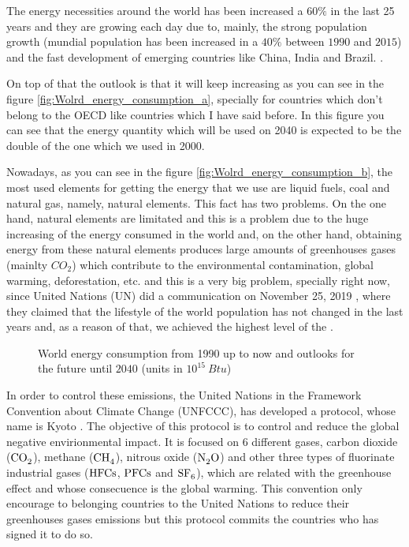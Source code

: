 The energy necessities around the world has been increased a $60\%$ in the last 25 years and they are growing each day due to, mainly, the strong population growth (mundial population has been increased in a $40\%$ between $1990$ and $2015$) and the fast development of emerging countries like China, India and Brazil. \cite{Renovables}. 

On top of that the outlook is that it will keep increasing as you can see in the figure \ref{fig:Wolrd_energy_consumption_a}, specially for countries which don't belong to the OECD like countries which I have said before. In this figure you can see that the energy quantity which will be used on 2040 is expected to be the double of the one which we used in 2000. 

Nowadays, as you can see in the figure \ref{fig:Wolrd_energy_consumption_b}, the most used elements for getting the energy that we use are liquid fuels, coal and natural gas, namely, natural elements. This fact has two problems. On the one hand, natural elements are limitated and this is a problem due to the huge increasing of the energy consumed in the world and, on the other hand, obtaining energy from these natural elements produces large amounts of greenhouses gases (mainlty $CO_2$) which contribute to the environmental contamination, global warming, deforestation, etc. and this is a very big problem, specially right now, since United Nations (UN) did a communication on November 25, 2019 \cite{HighestCO2}, where they claimed that the lifestyle of the world population has not changed in the last years and, as a reason of that, we achieved the highest level of the .

\begin{figure}[]
 \centering
 \caption{World energy consumption from 1990 up to now and outlooks for the future until $2040$ (units in $10^{15}~Btu$) \cite{EIA}}
 \label{fig:Wolrd_energy_consumption} 
\end{figure}

In order to control these emissions, the United Nations in the Framework Convention about Climate Change (UNFCCC), has developed a protocol, whose name is Kyoto \cite{Kyoto}. The objective of this protocol is to control and reduce the global negative envirionmental impact. It is focused on 6 different gases, carbon dioxide ($\ce{CO_2}$), methane ($\ce{CH_4}$), nitrous oxide ($\ce{N_2 O}$) and other three types of fluorinate industrial gases ($\ce{HFCs}$, $\ce{PFCs}$ and $\ce{SF6}$), which are related with the greenhouse effect and whose consecuence is the global warming. This convention only encourage to belonging countries to the United Nations to reduce their greenhouses gases emissions but this protocol commits the countries who has signed it to do so.

